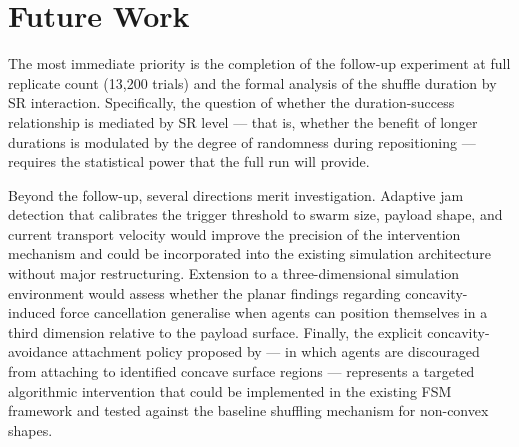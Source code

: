 \section{Future Work}
\label{sec:disc_future}

The most immediate priority is the completion of the follow-up experiment at full replicate count (13,200 trials) and the formal analysis of the shuffle duration by SR interaction. Specifically, the question of whether the duration-success relationship is mediated by SR level — that is, whether the benefit of longer durations is modulated by the degree of randomness during repositioning — requires the statistical power that the full run will provide.

Beyond the follow-up, several directions merit investigation. Adaptive jam detection that calibrates the trigger threshold to swarm size, payload shape, and current transport velocity would improve the precision of the intervention mechanism and could be incorporated into the existing simulation architecture without major restructuring. Extension to a three-dimensional simulation environment would assess whether the planar findings regarding concavity-induced force cancellation generalise when agents can position themselves in a third dimension relative to the payload surface. Finally, the explicit concavity-avoidance attachment policy proposed by \citet{arxiv2024concave} — in which agents are discouraged from attaching to identified concave surface regions — represents a targeted algorithmic intervention that could be implemented in the existing FSM framework and tested against the baseline shuffling mechanism for non-convex shapes.
